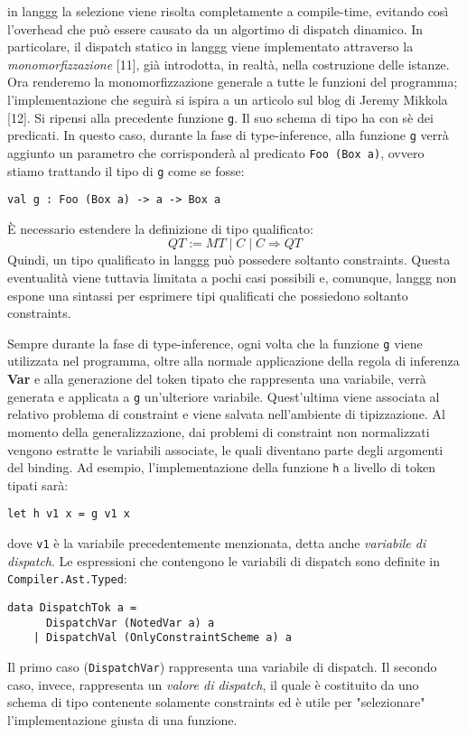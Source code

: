 \documentclass[10pt,a4paper]{article}
\begin{document}
in langgg la selezione viene risolta completamente a compile-time, evitando così l'overhead che può essere causato
da un algortimo di dispatch dinamico. In particolare, il dispatch statico in langgg viene implementato attraverso
la \textit{monomorfizzazione} [11], già introdotta, in realtà, nella costruzione delle istanze. Ora renderemo la
monomorfizzazione generale a tutte le funzioni del programma; l'implementazione che seguirà si ispira a un articolo
sul blog di Jeremy Mikkola [12]. Si ripensi alla precedente funzione \texttt{g}. Il suo
schema di tipo ha con sè dei predicati. In questo caso, durante la fase di type-inference, alla funzione \texttt{g}
verrà aggiunto un parametro che corrisponderà al predicato \texttt{Foo (Box a)}, ovvero stiamo trattando il tipo di
\texttt{g} come se fosse:
\begin{lstlisting}
val g : Foo (Box a) -> a -> Box a
\end{lstlisting}
\`E necessario estendere la definizione di tipo qualificato:
\[ QT := MT \; | \; C \; | \; C \Rightarrow QT \]
Quindi, un tipo qualificato in langgg può possedere soltanto constraints. Questa eventualità viene tuttavia limitata
a pochi casi possibili e, comunque, langgg non espone una sintassi per esprimere tipi qualificati che possiedono
soltanto constraints.

Sempre durante la fase di type-inference, ogni volta che la funzione \texttt{g} viene utilizzata nel programma, oltre
alla normale applicazione della regola di inferenza \textbf{Var} e alla generazione del token tipato che rappresenta
una variabile, verrà generata e applicata a \texttt{g} un'ulteriore variabile. Quest'ultima viene associata al
relativo problema di constraint e viene salvata nell'ambiente di tipizzazione. Al momento della generalizzazione,
dai problemi di constraint non normalizzati vengono estratte le variabili associate, le quali diventano parte degli
argomenti del binding. Ad esempio, l'implementazione della funzione \texttt{h} a livello di token tipati sarà:
\begin{lstlisting}
let h v1 x = g v1 x
\end{lstlisting}
dove \texttt{v1} è la variabile precedentemente menzionata, detta anche \textit{variabile di dispatch}. Le espressioni
che contengono le variabili di dispatch sono definite in \texttt{Compiler.Ast.Typed}:
\begin{lstlisting}
data DispatchTok a =
      DispatchVar (NotedVar a) a
    | DispatchVal (OnlyConstraintScheme a) a
\end{lstlisting}
Il primo caso (\texttt{DispatchVar}) rappresenta una variabile di dispatch. Il secondo caso, invece, rappresenta un
\textit{valore di dispatch}, il quale è costituito da uno schema di tipo contenente solamente constraints ed è utile
per "selezionare" l'implementazione giusta di una funzione.
\end{document}
